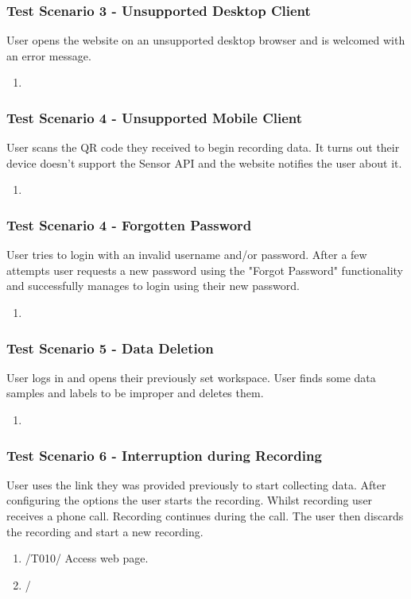 \subsubsection{Test Scenario 3 - Unsupported Desktop Client}
User opens the website on an unsupported desktop browser and is welcomed with an error message.
\begin{enumerate}
    \item 
\end{enumerate} 
\subsubsection{Test Scenario 4 - Unsupported Mobile Client}
User scans the QR code they received to begin recording data. It turns out their device doesn't support the Sensor API and the website notifies the user about it.
\begin{enumerate}
    \item 
\end{enumerate}
\subsubsection{Test Scenario 4 - Forgotten Password}
User tries to login with an invalid username and/or password. After a few attempts user requests a new password using the "Forgot Password" functionality and successfully manages to login using their new password.
\begin{enumerate}
    \item 
\end{enumerate} 
\subsubsection{Test Scenario 5 - Data Deletion} 
User logs in and opens their previously set workspace. User finds some data samples and labels to be improper and deletes them.
\begin{enumerate}
    \item 
\end{enumerate}
\subsubsection{Test Scenario 6 - Interruption during Recording}
User uses the link they was provided previously to start collecting data. After configuring the options the user starts the recording. Whilst recording user receives a phone call. Recording continues during the call. The user then discards the recording and start a new recording. 
\begin{enumerate}
    \item /T010/ Access web page.
    \item /
\end{enumerate}
